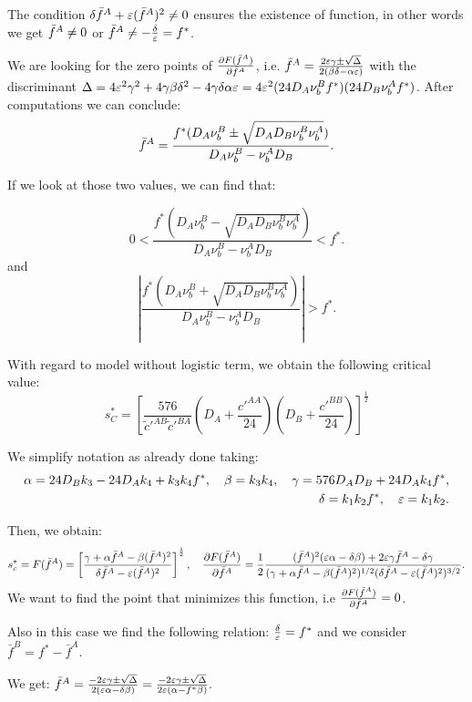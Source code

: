 \begin{remark}
	The condition ${\delta} {\bar{f}^A} + \varepsilon ({\bar{f}^A})^2 \ne 0 $ ensures the existence of function, in other words we get  ${\bar{f}^A} \ne 0 $ or ${\bar{f}^A} \ne -\frac{{\delta}}{\varepsilon}=f^*$. 
\end{remark}

We are looking for the zero points of $\frac{{\partial} F({\bar{f}^A})}{{\partial} {\bar{f}^A}}$, i.e. 
$ {\bar{f}^A}=\frac{2 \varepsilon {\gamma} \pm \sqrt{\Delta}}{2({\beta} {\delta} - {\alpha} \varepsilon )} $ with the discriminant
$\Delta=4\varepsilon^2 {\gamma}^2 + 4 {\gamma} {\beta} {\delta}^2 -4 {\gamma} {\delta} {\alpha} \varepsilon = 4\varepsilon^2(24D_A \nu_b^B f^*)(24 D_B \nu_b^A f^*)$. After computations we can conclude:
\begin{equation}
{\bar{f}^A}=\frac{f^*(D_A \nu_b^B \pm \sqrt{D_A D_B \nu_b^B \nu_b^A})}{D_A \nu_b^B -\nu_b^A D_B}.
\end{equation}

If we look at those two values, we can find that:

\begin{equation}
 0<\frac{f^*(D_A \nu_b^B - \sqrt{D_A D_B \nu_b^B \nu_b^A})}{D_A \nu_b^B -\nu_b^A D_B}<f^*.
\end{equation}
and
\begin{equation}
 \left|\frac{f^*(D_A \nu_b^B + \sqrt{D_A D_B \nu_b^B \nu_b^A})}{D_A \nu_b^B -\nu_b^A D_B}\right|>f^*.
\end{equation}



With regard to model without logistic term, we obtain the following critical value:
$$ s^{*}_{C}= \left[\frac{576}{\tilde{c}'^{AB} \tilde{c}'^{BA}} \left( D_A+\frac{c'^{AA}}{24} \right) \left(D_B+\frac{c'^{BB}}{24} \right) \right]^{\frac{1}{2}} $$

We simplify notation as already done taking:
\begin{align}
{\alpha}=24D_Bk_3-24D_Ak_4+k_3k_4f^{*}, \quad {\beta}=k_3k_4, \quad {\gamma}=576D_AD_B+24D_Ak_4f^{*}, \\
{\delta}=k_1k_2f^{*}, \quad \varepsilon=k_1k_2.
\end{align}
             
Then, we obtain: 
$$ s^{*}_c=F({\bar{f}^A})=\left[\frac{{\gamma} +{\alpha} {\bar{f}^A} - {\beta} ({\bar{f}^A})^2}{{\delta} {\bar{f}^A}-\varepsilon({\bar{f}^A})^2} \right]^{\frac{1}{2}},  \quad \frac{{\partial} F({\bar{f}^A})}{{\partial} {\bar{f}^A}}=\frac{1}{2} \frac{({\bar{f}^A})^{2}(\varepsilon {\alpha}-{\delta}{\beta})+2\varepsilon{\gamma}{\bar{f}^A}-{\delta}{\gamma}}{({\gamma}+{\alpha} {\bar{f}^A}-{\beta}({\bar{f}^A})^2)^{1/2} ({\delta}{\bar{f}^A}-\varepsilon({\bar{f}^A})^2)^{3/2} }.  $$
We want to find the point that minimizes this function, i.e $\frac{{\partial} F({\bar{f}^A})}{{\partial} {\bar{f}^A}}=0$. 
\begin{remark}
	Also in this case we find the following relation: $\frac{{\delta}}{\varepsilon}=f^{*}$ and we consider $\bar{f}^B=f^*-\bar{f}^A$.
\end{remark}
We get:
${\bar{f}^A}= \frac{-2\varepsilon {\gamma} \pm \sqrt{\Delta}}{2(\varepsilon {\alpha}-{\delta}{\beta})}=\frac{-2\varepsilon {\gamma} \pm \sqrt{\Delta}}{2\varepsilon ({\alpha}-f^{*}{\beta})}.$

